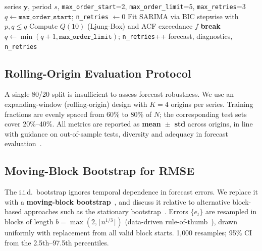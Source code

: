 \documentclass[sn-mathphys-num,pdflatex]{sn-jnl}
\begin{document}
\begin{algorithm}[ht]
\caption{Diagnostic-Gated SARIMA Fitting}
\label{alg:refit}
\begin{algorithmic}[1]
\Require series $\mathbf{y}$, period $s$, \texttt{max\_order\_start}=2,
\texttt{max\_order\_limit}=5, \texttt{max\_retries}=3
\State $q \leftarrow \texttt{max\_order\_start}$;
\texttt{n\_retries} $\leftarrow 0$
\Repeat
\State Fit SARIMA via BIC stepwise with $p,q \leq q$
\State Compute $Q(10)$ (Ljung-Box) and ACF exceedance $f$
\State \textbf{break} 
\EndIf
\State $q \leftarrow \min(q+1,\texttt{max\_order\_limit})$;
\texttt{n\_retries}++
\State \Return forecast, diagnostics, \texttt{n\_retries}
\end{algorithmic}
\end{algorithm}

\subsection{Rolling-Origin Evaluation Protocol}
\label{sec:rolling}

A single 80/20 split is insufficient to assess forecast robustness.
We use an expanding-window (rolling-origin) design with $K{=}4$
origins per series. Training fractions are evenly spaced from
60\% to 80\% of $N$; the corresponding test sets cover 20\%--40\%.
All metrics are reported as \textbf{mean~$\pm$~std} across origins,
in line with guidance on out-of-sample tests, diversity and
adequacy in forecast evaluation~\cite{tashman2000oos, bergmeir2012cv, hewamalage2023pitfalls}.

\subsection{Moving-Block Bootstrap for RMSE}
\label{sec:mbb}

The i.i.d.\ bootstrap ignores temporal dependence in forecast errors.
We replace it with a \textbf{moving-block bootstrap}~\cite{kunsch1989},
and discuss it relative to alternative block-based approaches such as
the stationary bootstrap~\cite{politis1994stationary}.
Errors $\{e_t\}$ are resampled in blocks of length
$b=\max(2,\lceil n^{1/3}\rceil)$ (data-driven rule-of-thumb~\cite{kunsch1989}),
drawn uniformly with replacement from all valid block starts.
1{,}000 resamples; 95\% CI from the 2.5th--97.5th percentiles.
\end{document}
